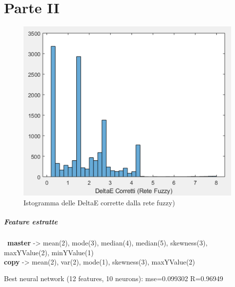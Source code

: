 \chapter{Parte II}

\begin{figure}
\begin{center}
	\includegraphics[scale=0.8]{images/rete2-istogramma-deltaecorretti.PNG}
\end{center}
\caption{Istogramma delle DeltaE corrette dalla rete fuzzy)}
\end{figure}

\paragraph{Feature estratte}\
\textbf{master} -> mean(2), mode(3), median(4), median(5), skewness(3), maxYValue(2), minYValue(1)
\\
\textbf{copy} -> mean(2), var(2), mode(1), skewness(3), maxYValue(2)

Best neural network (12 features, 10 neurons): mse=0.099302 R=0.96949